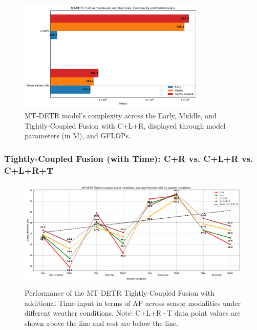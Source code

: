 \documentclass[report.tex]{subfiles}
\begin{document}
    \begin{figure}[h!]
        \centering
        \includegraphics[width=0.8\textwidth]{images/results/mtdetr/EMT_CLR/model_complexity.pdf}
        \caption{MT-DETR model's complexity across the Early, Middle, and Tightly-Coupled Fusion with C+L+R, displayed through model parameters (in M), and GFLOPs.}
        \label{fig:mtdetr_emt_crl_model_complexity}
    \end{figure}

    \FloatBarrier
    \subsubsection{Tightly-Coupled Fusion (with Time): C+R vs. C+L+R vs. C+L+R+T}

    \begin{figure}[h!]
        \centering
        \includegraphics[width=1.0\textwidth]{images/results/mtdetr/T_CLRT/ap.pdf}
        \caption{Performance of the MT-DETR Tightly-Coupled Fusion with additional Time input in terms of AP across sensor modalities under different weather conditions. Note: C+L+R+T data point values are shown above the line and rest are below the line.}
        \label{fig:mtdetr_t_clrt_ap}
    \end{figure}
\end{document}
